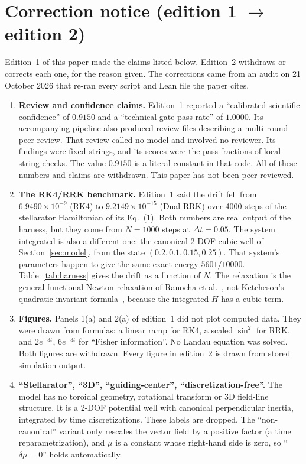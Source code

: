 \documentclass[11pt,a4paper]{article}
\theoremstyle{definition}
\begin{document}
\section*{Correction notice (edition 1 $\to$ edition 2)}
Edition~1 of this paper made the claims listed below. Edition~2 withdraws or corrects each one, for the reason given. The corrections came from an audit on 21 October 2026 that re-ran every script and Lean file the paper cites.
\begin{enumerate}
  \item \textbf{Review and confidence claims.} Edition~1 reported a ``calibrated scientific confidence'' of $0.9150$ and a ``technical gate pass rate'' of $1.0000$. Its accompanying pipeline also produced review files describing a multi-round peer review. That review called no model and involved no reviewer. Its findings were fixed strings, and its scores were the pass fractions of local string checks. The value $0.9150$ is a literal constant in that code. All of these numbers and claims are withdrawn. This paper has not been peer reviewed.
  \item \textbf{The RK4/RRK benchmark.} Edition~1 said the drift fell from $6.9490\times10^{-9}$ (RK4) to $9.2149\times10^{-15}$ (Dual-RRK) over 4000 steps of the stellarator Hamiltonian of its Eq.~(1). Both numbers are real output of the harness, but they come from $N=1000$ steps at $\Delta t=0.05$. The system integrated is also a different one: the canonical 2-DOF cubic well of Section~\ref{sec:model}, from the state $(0.2,0.1,0.15,0.25)$. That system's parameters happen to give the same exact energy $5601/10000$. Table~\ref{tab:harness} gives the drift as a function of $N$. The relaxation is the general-functional Newton relaxation of Ranocha et al.~\cite{Ranocha2020}, not Ketcheson's quadratic-invariant formula~\cite{Ketcheson2019}, because the integrated $H$ has a cubic term.
  \item \textbf{Figures.} Panels 1(a) and 2(a) of edition~1 did not plot computed data. They were drawn from formulas: a linear ramp for RK4, a scaled $\sin^2$ for RRK, and $2e^{-3t}$, $6e^{-3t}$ for ``Fisher information''. No Landau equation was solved. Both figures are withdrawn. Every figure in edition~2 is drawn from stored simulation output.
  \item \textbf{``Stellarator'', ``3D'', ``guiding-center'', ``discretization-free''.} The model has no toroidal geometry, rotational transform or 3D field-line structure. It is a 2-DOF potential well with canonical perpendicular inertia, integrated by time discretizations. These labels are dropped. The ``non-canonical'' variant only rescales the vector field by a positive factor (a time reparametrization), and $\mu$ is a constant whose right-hand side is zero, so ``$\delta\mu=0$'' holds automatically.

\end{enumerate}
\end{document}
